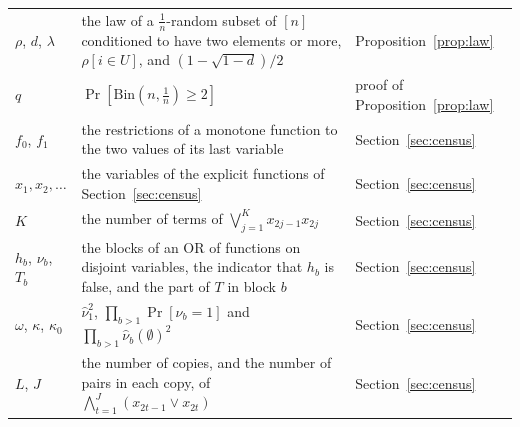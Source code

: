\documentclass[11pt]{amsart}
\theoremstyle{remark}
\begin{document}
\begin{longtable}{@{}>{\raggedright\arraybackslash}p{}>{\raggedright\arraybackslash}p{}>{\raggedright\arraybackslash}p{}@{}}
$\rho$, $d$, $\lambda$ & the law of a $\frac1n$-random subset of $[n]$ conditioned to have two elements or more, $\rho[i\in U]$, and $(1-\sqrt{1-d})/2$ & Proposition~\ref{prop:law} \\
$q$ & $\Pr[\mathrm{Bin}(n,\frac1n)\ge2]$ & proof of Proposition~\ref{prop:law} \\
$f_0$, $f_1$ & the restrictions of a monotone function to the two values of its last variable & Section~\ref{sec:census} \\
$x_1,x_2,\dots$ & the variables of the explicit functions of Section~\ref{sec:census} & Section~\ref{sec:census} \\
$K$ & the number of terms of $\bigvee_{j=1}^Kx_{2j-1}x_{2j}$ & Section~\ref{sec:census} \\
$h_b$, $\nu_b$, $T_b$ & the blocks of an OR of functions on disjoint variables, the indicator that $h_b$ is false, and the part of $T$ in block $b$ & Section~\ref{sec:census} \\
$\omega$, $\kappa$, $\kappa_0$ & $\hat\nu_1^2$, $\prod_{b>1}\Pr[\nu_b=1]$ and $\prod_{b>1}\hat\nu_b(\emptyset)^2$ & Section~\ref{sec:census} \\
$L$, $J$ & the number of copies, and the number of pairs in each copy, of $\bigwedge_{t=1}^J(x_{2t-1}\vee x_{2t})$ & Section~\ref{sec:census} \\
\bottomrule
\end{longtable}
\end{document}
